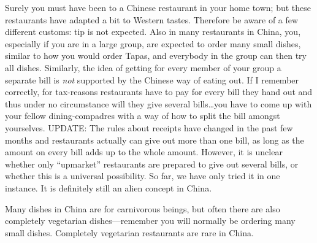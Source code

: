 \documentclass[11pt]{report}
\begin{document}
Surely you must have been to a Chinese restaurant in your home
town; but these restaurants have adapted a bit to Western
tastes. Therefore be aware of a few different customs: tip is
not expected. Also in many restaurants in China, you,
especially if you are in a large group, are expected to order
many small dishes, similar to how you would order Tapas, and
everybody in the group can then try all dishes. Similarly, the
idea of getting for every member of your group a separate bill
is \emph{not} supported by the Chinese way of eating out. If I
remember correctly, for tax-reasons restaurants have to pay
for every bill they hand out and thus under no circumstance
will they give several bills\ldots{}you have to come up with
your fellow dining-compadres with a way of how to split the
bill amongst yourselves. UPDATE: The rules about receipts have
changed in the past few months and restaurants actually can
give out more than one bill, as long as the amount on every
bill adds up to the whole amount. However, it is unclear
whether only ``upmarket'' restaurants are prepared to give out
several bills, or whether this is a universal possibility. So
far, we have only tried it in one instance. It is definitely
still an alien concept in China.

Many dishes in China are for carnivorous beings, but often
there are also completely vegetarian dishes---remember you
will normally be ordering many small dishes. Completely
vegetarian restaurants are rare in China.
\end{document}
